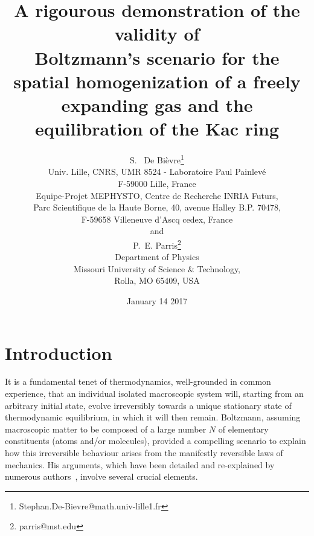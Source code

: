 \documentclass{article}
\numberwithin{equation}{section}
\begin{document}
\title{A rigourous demonstration of the validity of \\Boltzmann's scenario for
the spatial homogenization of a freely expanding gas and the equilibration of the Kac ring}
\author{S. {\ De Bi\`{e}vre}\thanks{Stephan.De-Bievre@math.univ-lille1.fr} \\
Univ. Lille, CNRS, UMR 8524 - Laboratoire Paul Painlev\'e\\ F-59000 Lille, France\\
Equipe-Projet MEPHYSTO,
Centre de Recherche INRIA Futurs,\\
Parc Scientifique de la Haute Borne, 40, avenue Halley B.P. 70478,\\
F-59658 Villeneuve d'Ascq cedex, France\\
and\\
P.~E. {Parris}\thanks{
parris@mst.edu} \\
Department of Physics\\
Missouri University of Science \& Technology,\\
Rolla, MO 65409, USA\\
}
\date{January 14 2017}

\maketitle
{}

\newpage
\section{Introduction}
It is a fundamental tenet of thermodynamics, well-grounded in common experience, that an individual
isolated macro\-scopic sys\-tem will, starting from an arbitrary initial state, evolve
irreversibly towards a unique stationary state of thermodynamic equilibrium, in
which it will then remain.
Boltzmann, assuming macroscopic matter to be composed of a large number $N$ of elementary
constituents (atoms and/or molecules), provided a compelling scenario to explain how this
irreversible behaviour arises from the manifestly reversible laws of mechanics. His
arguments, which have been detailed and re-explained by numerous authors~\cite{Eh59, Ka59, Fe67,
Le93, Br96, Pe90, Le08}, involve several crucial elements.
\end{document}
